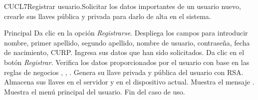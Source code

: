 
\begin{UseCase}{CUCL7}{Registrar usuario.}{Solicitar los datos importantes de un usuario nuevo, crearle sus llaves pública y privada para darlo de alta en el sistema.
	}
\end{UseCase}


\begin{UCtrayectoria}{Principal}
	\UCpaso[\UCactor] Da clic en la opción \textit{Registrarse}.
	\UCpaso Despliega los campos para introducir nombre, primer apellido, segundo apellido, nombre de usuario, contraseña, fecha de nacimiento, CURP.
	\UCpaso[\UCactor] Ingresa sus datos que han sido solicitados. \label{CUCL7Regresa}  
	\UCpaso[\UCactor] Da clic en el botón \textit{Registrar}.
	\UCpaso Verifica los datos proporcionados por el usuario con base en las reglas de negocios ,  ,  .        
	\UCpaso Genera su llave privada y pública del usuario con RSA. 
	\UCpaso Almacena sus llaves en el servidor y en el dispositivo actual.
	\UCpaso Muestra el mensaje . 
	\UCpaso Muestra el menú principal del usuario.
	\UCpaso Fin del caso de uso.
\end{UCtrayectoria}


